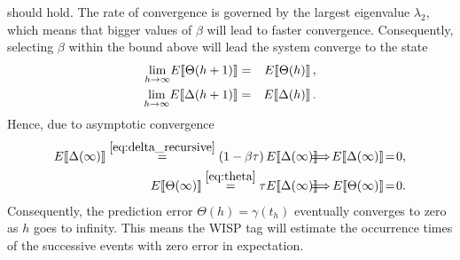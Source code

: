 should hold. The 
rate of convergence is governed by 
the largest eigenvalue $\lambda_2$, which means that bigger values of $\beta$ 
will lead to faster convergence. 
Consequently, selecting $\beta$ within the bound above will lead the system  
converge to the state  
\begin{eqnarray}
\underset{h\rightarrow\infty}{\lim}\expected{\Theta(h+1)} &=&
\expected{\Theta(h)}, \label{eq:asymp_theta} \\
\underset{h\rightarrow\infty}{\lim}\expected{\Delta(h+1)}&=&
\expected{\Delta(h)} \label{eq:asymp_delta}.
\end{eqnarray}
Hence, due to asymptotic convergence
\begin{eqnarray}
\expected{\Delta(\infty)} \overset{\eqref{eq:delta_recursive}}{=} 
\left(1-\beta 
\tau\right)\expected{\Delta(\infty)} &\!\!\!\!\!\!\!\implies\!\!\!\!\!\!\!& \expected{\Delta(\infty)}\!=\!0, 
\label{eq:delta_convergence}\\
\expected{\Theta(\infty)}  \overset{\eqref{eq:theta}}{=} 
\tau\expected{\Delta(\infty)}&\!\!\!\!\!\!\!\implies\!\!\!\!\!\!\!&\expected{\Theta(\infty)}\!=\!0. 
\label{eq:expected_error}
\end{eqnarray}
Consequently, the prediction error $\Theta(h)=\gamma(t_h)$ 
eventually converges to zero as $h$ goes to infinity. This means the WISP tag 
will estimate the occurrence times of the successive
events with zero error in expectation. 


